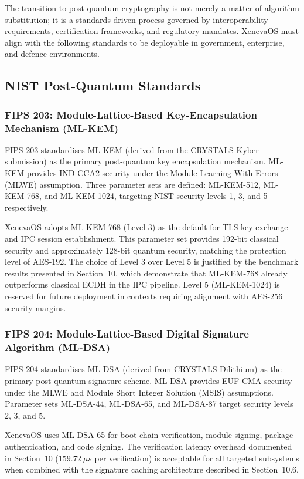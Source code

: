 \documentclass[11pt, a4paper]{article}
\begin{document}
The transition to post-quantum cryptography is not merely a matter of algorithm substitution; it is a standards-driven process governed by interoperability requirements, certification frameworks, and regulatory mandates. XenevaOS must align with the following standards to be deployable in government, enterprise, and defence environments.

\subsection{NIST Post-Quantum Standards}\label{sec:nist-pqc-standards}

\subsubsection{FIPS 203: Module-Lattice-Based Key-Encapsulation Mechanism (ML-KEM)}

FIPS 203 standardises ML-KEM (derived from the CRYSTALS-Kyber submission) as the primary post-quantum key encapsulation mechanism. ML-KEM provides IND-CCA2 security under the Module Learning With Errors (MLWE) assumption. Three parameter sets are defined: ML-KEM-512, ML-KEM-768, and ML-KEM-1024, targeting NIST security levels 1, 3, and 5 respectively.

XenevaOS adopts ML-KEM-768 (Level 3) as the default for TLS key exchange and IPC session establishment. This parameter set provides 192-bit classical security and approximately 128-bit quantum security, matching the protection level of AES-192. The choice of Level 3 over Level 5 is justified by the benchmark results presented in Section~10, which demonstrate that ML-KEM-768 already outperforms classical ECDH in the IPC pipeline. Level 5 (ML-KEM-1024) is reserved for future deployment in contexts requiring alignment with AES-256 security margins.

\subsubsection{FIPS 204: Module-Lattice-Based Digital Signature Algorithm (ML-DSA)}

FIPS 204 standardises ML-DSA (derived from CRYSTALS-Dilithium) as the primary post-quantum signature scheme. ML-DSA provides EUF-CMA security under the MLWE and Module Short Integer Solution (MSIS) assumptions. Parameter sets ML-DSA-44, ML-DSA-65, and ML-DSA-87 target security levels 2, 3, and 5.

XenevaOS uses ML-DSA-65 for boot chain verification, module signing, package authentication, and code signing. The verification latency overhead documented in Section~10 ($159.72~\mu s$ per verification) is acceptable for all targeted subsystems when combined with the signature caching architecture described in Section~10.6.
\end{document}
